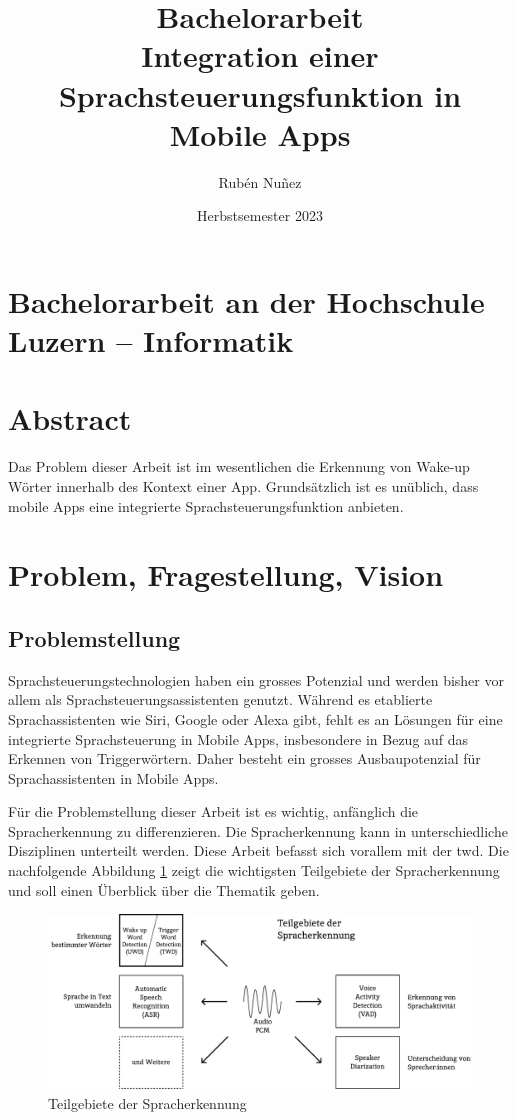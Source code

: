 \documentclass[11pt,a4paper]{article}
\title{
{\LARGE Bachelorarbeit}\\[2em]
{\textbf{Integration einer Sprachsteuerungsfunktion {\break} in Mobile Apps}}
}
\author{Rubén Nuñez}
\date{Herbstsemester 2023}
\begin{document}
\maketitle
\thispagestyle{empty} %
\newpage

\section*{Bachelorarbeit an der Hochschule Luzern -- Informatik}

\newpage

\newpage \section*{Abstract}
Das Problem dieser Arbeit ist im wesentlichen die Erkennung von Wake-up Wörter innerhalb
des Kontext einer App. Grundsätzlich ist es unüblich, dass mobile Apps eine
integrierte Sprachsteuerungsfunktion anbieten.


\newpage
\tableofcontents

\newpage

\newpage \section{Problem, Fragestellung, Vision}
\subsection{Problemstellung}
Sprachsteuerungstechnologien haben ein grosses Potenzial und werden bisher vor allem als
Sprachsteuerungsassistenten genutzt. Während es etablierte Sprachassistenten wie Siri, Google
oder Alexa gibt, fehlt es an Lösungen für eine integrierte Sprachsteuerung in Mobile Apps,
insbesondere in Bezug auf das Erkennen von Triggerwörtern. Daher besteht ein grosses 
Ausbaupotenzial für Sprachassistenten in Mobile Apps. 

\noindent \newline
Für die Problemstellung dieser Arbeit ist es wichtig, anfänglich die Spracherkennung zu 
differenzieren. Die Spracherkennung kann in unterschiedliche Disziplinen unterteilt werden.
Diese Arbeit befasst sich vorallem mit der \gls{twd}. Die nachfolgende Abbildung
\ref{fig:asr_twd} zeigt die wichtigsten Teilgebiete der Spracherkennung und soll einen 
Überblick über die Thematik geben.

\vspace{1em}
\begin{figure}[h]
	\centering
	\includegraphics[width=0.8\linewidth]{img/asr_twd.pdf}
	\caption{Teilgebiete der Spracherkennung}
	\label{fig:asr_twd}

\end{figure}
\end{document}
